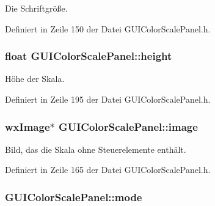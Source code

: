 Die Schriftgröße. 



Definiert in Zeile 150 der Datei G\-U\-I\-Color\-Scale\-Panel.\-h.

\hypertarget{classGUIColorScalePanel_a5bbc9ff741f566a75f757e54324dac5a}{
\subsubsection[{height}]{\setlength{\rightskip}{0pt plus 5cm}float G\-U\-I\-Color\-Scale\-Panel\-::height\hspace{0.3cm}{\ttfamily [private]}}}\label{classGUIColorScalePanel_a5bbc9ff741f566a75f757e54324dac5a}


Höhe der Skala. 



Definiert in Zeile 195 der Datei G\-U\-I\-Color\-Scale\-Panel.\-h.

\hypertarget{classGUIColorScalePanel_ac398e4b12cea263a89db6dd236ec1e87}{
\subsubsection[{image}]{\setlength{\rightskip}{0pt plus 5cm}wx\-Image$\ast$ G\-U\-I\-Color\-Scale\-Panel\-::image\hspace{0.3cm}{\ttfamily [private]}}}\label{classGUIColorScalePanel_ac398e4b12cea263a89db6dd236ec1e87}


Bild, das die Skala ohne Steuerelemente enthält. 



Definiert in Zeile 165 der Datei G\-U\-I\-Color\-Scale\-Panel.\-h.

\hypertarget{classGUIColorScalePanel_ad2f795e0d3a1c8e731da16d3320dbd34}{
\subsubsection[{mode}]{ G\-U\-I\-Color\-Scale\-Panel\-::mode\hspace{0.3cm}{\ttfamily [private]}}}\label{classGUIColorScalePanel_ad2f795e0d3a1c8e731da16d3320dbd34}


